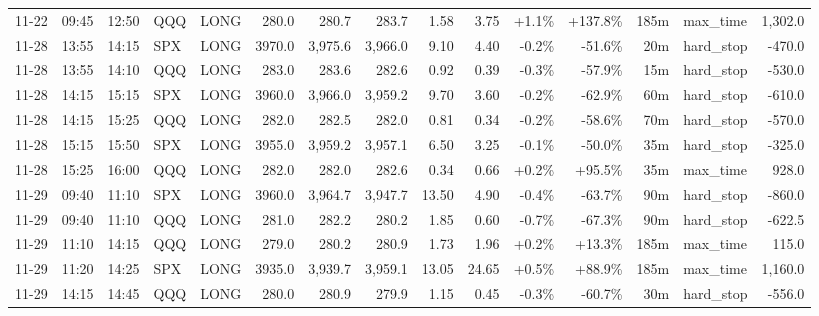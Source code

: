 \documentclass[11pt,a4paper,twoside]{article}
\begin{document}
\begin{landscape}
\begin{center}
\begin{longtable}{>{\color{txtmain}}l l l l l r r r r r r r r >{\color{txtmain}}l r}
11-22 & 09:45 & 12:50 & QQQ & LONG & 280.0 & 280.7 & 283.7 & 1.58 & 3.75 & \textcolor{wingreen}{+1.1\%} & \textcolor{wingreen}{+137.8\%} & 185m & max\_time & \textcolor{wingreen}{1,302.0} \\
11-28 & 13:55 & 14:15 & SPX & LONG & 3970.0 & 3,975.6 & 3,966.0 & 9.10 & 4.40 & \textcolor{lossred}{-0.2\%} & \textcolor{lossred}{-51.6\%} & 20m & hard\_stop & \textcolor{lossred}{-470.0} \\
11-28 & 13:55 & 14:10 & QQQ & LONG & 283.0 & 283.6 & 282.6 & 0.92 & 0.39 & \textcolor{lossred}{-0.3\%} & \textcolor{lossred}{-57.9\%} & 15m & hard\_stop & \textcolor{lossred}{-530.0} \\
11-28 & 14:15 & 15:15 & SPX & LONG & 3960.0 & 3,966.0 & 3,959.2 & 9.70 & 3.60 & \textcolor{lossred}{-0.2\%} & \textcolor{lossred}{-62.9\%} & 60m & hard\_stop & \textcolor{lossred}{-610.0} \\
11-28 & 14:15 & 15:25 & QQQ & LONG & 282.0 & 282.5 & 282.0 & 0.81 & 0.34 & \textcolor{lossred}{-0.2\%} & \textcolor{lossred}{-58.6\%} & 70m & hard\_stop & \textcolor{lossred}{-570.0} \\
11-28 & 15:15 & 15:50 & SPX & LONG & 3955.0 & 3,959.2 & 3,957.1 & 6.50 & 3.25 & \textcolor{lossred}{-0.1\%} & \textcolor{lossred}{-50.0\%} & 35m & hard\_stop & \textcolor{lossred}{-325.0} \\
11-28 & 15:25 & 16:00 & QQQ & LONG & 282.0 & 282.0 & 282.6 & 0.34 & 0.66 & \textcolor{wingreen}{+0.2\%} & \textcolor{wingreen}{+95.5\%} & 35m & max\_time & \textcolor{wingreen}{928.0} \\
11-29 & 09:40 & 11:10 & SPX & LONG & 3960.0 & 3,964.7 & 3,947.7 & 13.50 & 4.90 & \textcolor{lossred}{-0.4\%} & \textcolor{lossred}{-63.7\%} & 90m & hard\_stop & \textcolor{lossred}{-860.0} \\
11-29 & 09:40 & 11:10 & QQQ & LONG & 281.0 & 282.2 & 280.2 & 1.85 & 0.60 & \textcolor{lossred}{-0.7\%} & \textcolor{lossred}{-67.3\%} & 90m & hard\_stop & \textcolor{lossred}{-622.5} \\
11-29 & 11:10 & 14:15 & QQQ & LONG & 279.0 & 280.2 & 280.9 & 1.73 & 1.96 & \textcolor{wingreen}{+0.2\%} & \textcolor{wingreen}{+13.3\%} & 185m & max\_time & \textcolor{wingreen}{115.0} \\
11-29 & 11:20 & 14:25 & SPX & LONG & 3935.0 & 3,939.7 & 3,959.1 & 13.05 & 24.65 & \textcolor{wingreen}{+0.5\%} & \textcolor{wingreen}{+88.9\%} & 185m & max\_time & \textcolor{wingreen}{1,160.0} \\
11-29 & 14:15 & 14:45 & QQQ & LONG & 280.0 & 280.9 & 279.9 & 1.15 & 0.45 & \textcolor{lossred}{-0.3\%} & \textcolor{lossred}{-60.7\%} & 30m & hard\_stop & \textcolor{lossred}{-556.0} \\

\end{longtable}
\end{center}
\end{landscape}
\end{document}
